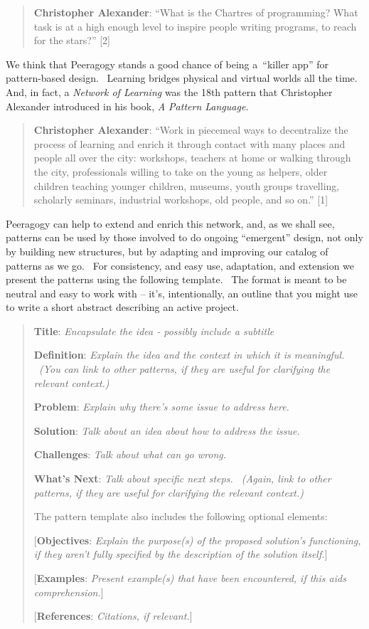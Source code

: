 \begin{quote}
\textbf{Christopher Alexander}: ``What is the Chartres of programming?
What task is at a high enough level to inspire people writing programs,
to reach for the stars?'' {[}2{]}
\end{quote}

We think that Peeragogy stands a good chance of being a~``killer app''
for pattern-based design.~ Learning bridges physical and virtual worlds
all the time.~ And, in fact, a \emph{Network of Learning} was the 18th
pattern that Christopher Alexander introduced in his book, \emph{A
Pattern Language}.

\begin{quote}
\textbf{Christopher Alexander}: ``Work in piecemeal ways to decentralize
the process of learning and enrich it through contact with many places
and people all over the city: workshops, teachers at home or walking
through the city, professionals willing to take on the young as helpers,
older children teaching younger children, museums, youth groups
travelling, scholarly seminars, industrial workshops, old people, and so
on.'' {[}1{]}
\end{quote}

Peeragogy can help to extend and enrich this network, and, as we shall
see, patterns can be used by those involved to do ongoing ``emergent''
design, not only by building new structures, but by adapting and
improving our catalog of patterns as we go.~ For consistency, and easy
use, adaptation, and extension we present the patterns using the
following template.~ The format is meant to be neutral and easy to work
with -- it's, intentionally, an outline that you might use to write a
short abstract describing an active project.

\begin{quote}
\textbf{Title}: \emph{Encapsulate the idea - possibly include a
subtitle}

\textbf{Definition}: \emph{Explain the idea and the context in which it
is meaningful. ~(You can link to other patterns, if they are useful for
clarifying the relevant context.)}

\textbf{Problem}: \emph{Explain why there's some issue to address here.}

\textbf{Solution}: \emph{Talk about an idea about how to address the
issue.}

\textbf{Challenges}: \emph{Talk about what can go wrong.}

\textbf{What's Next}: \emph{Talk about specific next steps. ~(Again,
link to other patterns, if they are useful for clarifying the relevant
context.)}

The pattern template also includes the following optional elements:

{[}\textbf{Objectives}: \emph{Explain the purpose(s) of the proposed
solution's functioning, if they aren't fully specified by the
description of the solution itself.}{]}

{[}\textbf{Examples}: \emph{Present example(s) that have been
encountered, if this aids comprehension.}{]}

{[}\textbf{References}: \emph{Citations, if relevant.}{]}
\end{quote}

